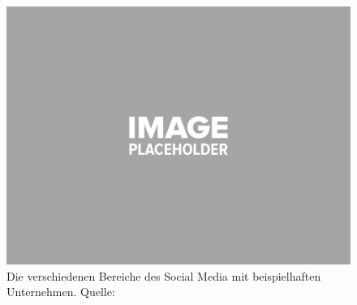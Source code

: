 \begin{figure}[H]
	\centering
	\includegraphics[width=\textwidth]{_img/placeholder_image.png}
	\caption[Social Media Kreislauf und Unternehmen]{Die verschiedenen Bereiche des Social Media mit beispielhaften Unternehmen. Quelle: \cite{wsocialm}}
	\label{fig:social_media}
\end{figure}